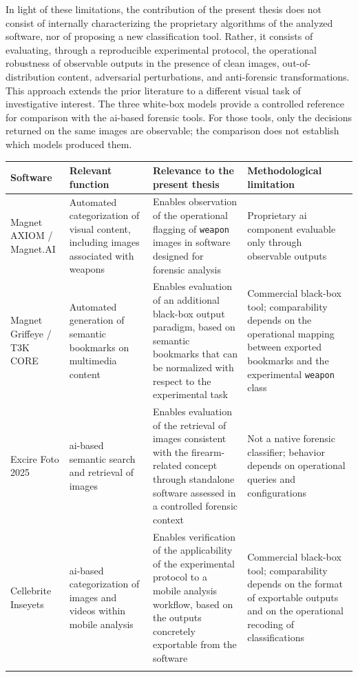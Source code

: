 In light of these limitations, the contribution of the present thesis does not
consist of internally characterizing the proprietary algorithms of the analyzed
software, nor of proposing a new classification tool. Rather, it consists of
evaluating, through a reproducible experimental protocol, the operational
robustness of observable outputs in the presence of clean images,
out-of-distribution content, adversarial perturbations, and anti-forensic
transformations. This approach extends the prior literature to a different
visual task of investigative interest. The three white-box models provide a
controlled reference for comparison with the \gls{ai}-based forensic tools.
For those tools, only the decisions returned on the same images are observable;
the comparison does not establish which models produced them.

\begin{table}[htbp]
    \centering
    \small
    \renewcommand{\arraystretch}{1.25}
    \begin{tabularx}{\textwidth}{@{}p{2.8cm}p{3.5cm}X p{3.2cm}@{}}
        \toprule
        \textbf{Software} &
        \textbf{Relevant function} &
        \textbf{Relevance to the present thesis} &
        \textbf{Methodological limitation} \\
        \midrule
        Magnet AXIOM / Magnet.AI &
        Automated categorization of visual content, including images associated with weapons &
        Enables observation of the operational flagging of \texttt{weapon} images in software designed for forensic analysis &
        Proprietary \gls{ai} component evaluable only through observable outputs \\
        \addlinespace
        Magnet Griffeye / T3K CORE &
        Automated generation of semantic bookmarks on multimedia content &
        Enables evaluation of an additional black-box output paradigm, based on semantic bookmarks that can be normalized with respect to the experimental task &
        Commercial black-box tool; comparability depends on the operational mapping between exported bookmarks and the experimental \texttt{weapon} class \\
        \addlinespace
        Excire Foto 2025 &
        \gls{ai}-based semantic search and retrieval of images &
        Enables evaluation of the retrieval of images consistent with the firearm-related concept through standalone software assessed in a controlled forensic context &
        Not a native forensic classifier; behavior depends on operational queries and configurations \\
        \addlinespace
        Cellebrite Inseyets &
        \gls{ai}-based categorization of images and videos within mobile analysis &
        Enables verification of the applicability of the experimental protocol to a mobile analysis workflow, based on the outputs concretely exportable from the software &
        Commercial black-box tool; comparability depends on the format of exportable outputs and on the operational recoding of classifications \\
        \addlinespace


\end{tabularx}
\end{table}

